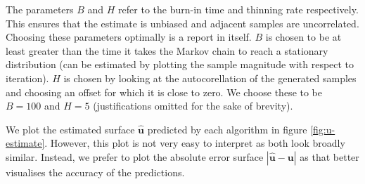 \documentclass[]{article}
\newcommand{\ubold}{\boldsymbol{u}}
\begin{document}
The parameters $B$ and $H$ refer to the burn-in time and thinning rate respectively. This ensures that the estimate is unbiased and adjacent samples are uncorrelated. Choosing these parameters optimally is a report in itself. $B$ is chosen to be at least greater than the time it takes the Markov chain to reach a stationary distribution (can be estimated by plotting the sample magnitude with respect to iteration). $H$ is chosen by looking at the autocorellation of the generated samples and choosing an offset for which it is close to zero. We choose these to be $B=100$ and $H=5$ (justifications omitted for the sake of brevity).

We plot the estimated surface $\hat{\ubold}$ predicted by each algorithm in figure \ref{fig:u-estimate}. However, this plot is not very easy to interpret as both look broadly similar. Instead, we prefer to plot the absolute error surface $|\hat{\ubold} - \ubold|$ as that better visualises the accuracy of the predictions.
%
\end{document}
